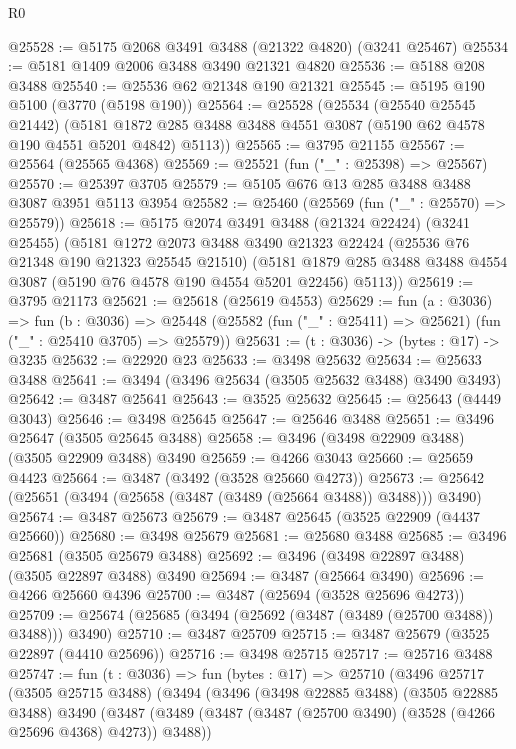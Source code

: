 \begin{lexlean}{R0}
\begin{coremodule}
@25528 := @5175 @2068 @3491 @3488 (@21322 @4820) (@3241 @25467)
@25534 := @5181 @1409 @2006 @3488 @3490 @21321 @4820
@25536 := @5188 @208 @3488
@25540 := @25536 @62 @21348 @190 @21321
@25545 := @5195 @190 @5100 (@3770 (@5198 @190))
@25564 := @25528
    (@25534
      (@25540 @25545 @21442)
      (@5181 @1872 @285 @3488 @3488 @4551 @3087 (@5190 @62 @4578 @190 @4551 @5201 @4842) @5113))
@25565 := @3795 @21155
@25567 := @25564 (@25565 @4368)
@25569 := @25521 (fun ("_" : @25398) => @25567)
@25570 := @25397 @3705
@25579 := @5105 @676 @13 @285 @3488 @3488 @3087 @3951 @5113 @3954
@25582 := @25460 (@25569 (fun ("_" : @25570) => @25579))
@25618 := @5175
    @2074
    @3491
    @3488
    (@21324 @22424)
    (@3241 @25455)
    (@5181
      @1272
      @2073
      @3488
      @3490
      @21323
      @22424
      (@25536 @76 @21348 @190 @21323 @25545 @21510)
      (@5181 @1879 @285 @3488 @3488 @4554 @3087 (@5190 @76 @4578 @190 @4554 @5201 @22456) @5113))
@25619 := @3795 @21173
@25621 := @25618 (@25619 @4553)
@25629 := fun (a : @3036) =>
  fun (b : @3036) =>
  @25448 (@25582 (fun ("_" : @25411) => @25621) (fun ("_" : @25410 @3705) => @25579))
@25631 := (t : @3036) -> (bytes : @17) -> @3235
@25632 := @22920 @23
@25633 := @3498 @25632
@25634 := @25633 @3488
@25641 := @3494 (@3496 @25634 (@3505 @25632 @3488) @3490 @3493)
@25642 := @3487 @25641
@25643 := @3525 @25632
@25645 := @25643 (@4449 @3043)
@25646 := @3498 @25645
@25647 := @25646 @3488
@25651 := @3496 @25647 (@3505 @25645 @3488)
@25658 := @3496 (@3498 @22909 @3488) (@3505 @22909 @3488) @3490
@25659 := @4266 @3043
@25660 := @25659 @4423
@25664 := @3487 (@3492 (@3528 @25660 @4273))
@25673 := @25642 (@25651 (@3494 (@25658 (@3487 (@3489 (@25664 @3488)) @3488))) @3490)
@25674 := @3487 @25673
@25679 := @3487 @25645 (@3525 @22909 (@4437 @25660))
@25680 := @3498 @25679
@25681 := @25680 @3488
@25685 := @3496 @25681 (@3505 @25679 @3488)
@25692 := @3496 (@3498 @22897 @3488) (@3505 @22897 @3488) @3490
@25694 := @3487 (@25664 @3490)
@25696 := @4266 @25660 @4396
@25700 := @3487 (@25694 (@3528 @25696 @4273))
@25709 := @25674 (@25685 (@3494 (@25692 (@3487 (@3489 (@25700 @3488)) @3488))) @3490)
@25710 := @3487 @25709
@25715 := @3487 @25679 (@3525 @22897 (@4410 @25696))
@25716 := @3498 @25715
@25717 := @25716 @3488
@25747 := fun (t : @3036) =>
  fun (bytes : @17) =>
  @25710
    (@3496
      @25717
      (@3505 @25715 @3488)
      (@3494
        (@3496
          (@3498 @22885 @3488)
          (@3505 @22885 @3488)
          @3490
          (@3487
            (@3489 (@3487 (@3487 (@25700 @3490) (@3528 (@4266 @25696 @4368) @4273)) @3488))

\end{coremodule}
\end{lexlean}
